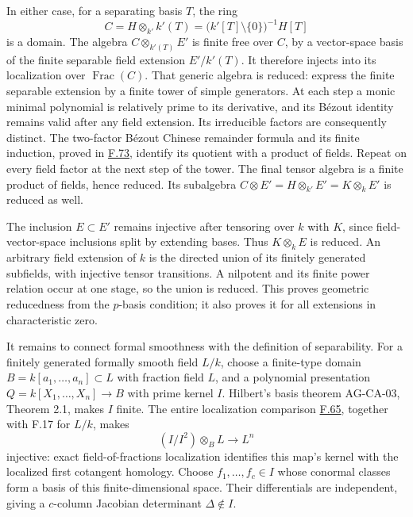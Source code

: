 \documentclass[11pt,a4paper,openany]{report}
\begin{document}
In either case, for a separating basis \(T\), the ring \[C=H\otimes_{k'}k'(T)=\bigl(k'[T]\setminus\{0\}\bigr)^{-1}H[T]\] is a domain. The algebra \(C\otimes_{k'(T)}E'\) is finite free over \(C\), by a vector-space basis of the finite separable field extension \(E'/k'(T)\). It therefore injects into its localization over \(\operatorname{Frac}(C)\). That generic algebra is reduced: express the finite separable extension by a finite tower of simple generators. At each step a monic minimal polynomial is relatively prime to its derivative, and its Bézout identity remains valid after any field extension. Its irreducible factors are consequently distinct. The two-factor Bézout Chinese remainder formula and its finite induction, proved in \hyperref[AG-RG-S05-algebra-lemma-product-local]{F.73}, identify its quotient with a product of fields. Repeat on every field factor at the next step of the tower. The final tensor algebra is a finite product of fields, hence reduced. Its subalgebra \(C\otimes E'=H\otimes_{k'}E'=K\otimes_kE'\) is reduced as well.

The inclusion \(E\subset E'\) remains injective after tensoring over \(k\) with \(K\), since field-vector-space inclusions split by extending bases. Thus \(K\otimes_kE\) is reduced. An arbitrary field extension of \(k\) is the directed union of its finitely generated subfields, with injective tensor transitions. A nilpotent and its finite power relation occur at one stage, so the union is reduced. This proves geometric reducedness from the \(p\)-basis condition; it also proves it for all extensions in characteristic zero.

It remains to connect formal smoothness with the definition of separability. For a finitely generated formally smooth field \(L/k\), choose a finite-type domain \(B=k[a_1,\ldots,a_n]\subset L\) with fraction field \(L\), and a polynomial presentation \(Q=k[X_1,\ldots,X_n]\to B\) with prime kernel \(I\). Hilbert's basis theorem AG-CA-03, Theorem 2.1, makes \(I\) finite. The entire localization comparison \hyperref[AG-RG-S05-algebra-lemma-localize-NL]{F.65}, together with F.17 for \(L/k\), makes \[
(I/I^2)\otimes_B L\longrightarrow L^n
\] injective: exact field-of-fractions localization identifies this map's kernel with the localized first cotangent homology. Choose \(f_1,\ldots,f_c\in I\) whose conormal classes form a basis of this finite-dimensional space. Their differentials are independent, giving a \(c\)-column Jacobian determinant \(\Delta\notin I\).
\end{document}
